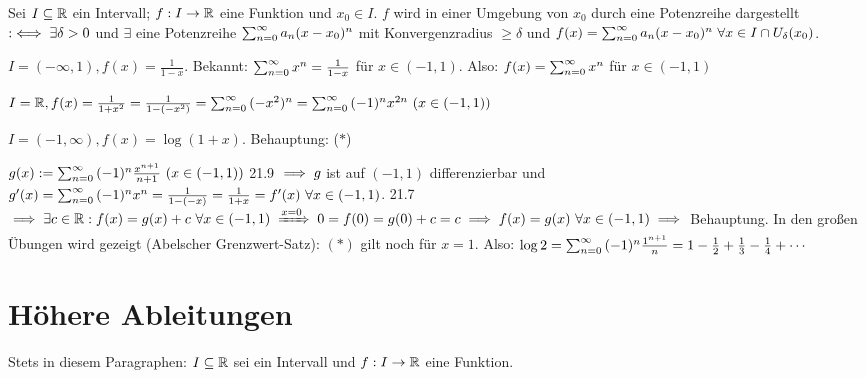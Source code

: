 \documentclass[a4paper,oneside,DIV15,BCOR12mm]{scrbook}
\begin{document}
\begin{definition}
Sei $I \subseteq \mathbb{R}$ ein Intervall; $f:I\to\mathbb{R}$ eine Funktion und $x_0\in I$. $f$ wird in einer Umgebung von $x_0$ durch eine Potenzreihe dargestellt $:\iff \exists \delta>0$ und $\exists$ eine Potenzreihe $\sum_{n=0}^{\infty}{a_n(x-x_0)^n}$ mit Konvergenzradius $\ge \delta$ und $f(x)=\sum_{n=0}^{\infty}{a_n(x-x_0)^n}\ \forall x \in I \cap U_{\delta}(x_0)$.
\end{definition}

\begin{beispiele}
\item $I=(-\infty, 1), f(x)=\frac{1}{1-x}.$ Bekannt: $\sum_{n=0}^{\infty}{x^n}=\frac{1}{1-x}$ für $x \in (-1, 1)$. Also: $f(x)=\sum_{n=0}^{\infty}{x^n}$ für $x \in (-1, 1)$
\item $I=\MdR, f(x)=\frac{1}{1+x^2}=\frac{1}{1-(-x^2)}=\reihenull{(-x^2)^n}=\reihenull{(-1)^nx^{2n}}\ (x\in(-1, 1))$
\item $I=(-1, \infty), f(x)=\log(1+x).$ Behauptung: ($*$) \\
\begin{beweis}
$g(x):=\sum_{n=0}^{\infty}{(-1)^n\frac{x^{n+1}}{n+1}}\ (x \in (-1, 1))$ 21.9 $\implies g$ ist auf $(-1, 1)$ differenzierbar und $g'(x)=\reihenull{(-1)^nx^n}=\frac{1}{1-(-x)}=\frac{1}{1+x}=f'(x)\ \forall x \in (-1, 1)$. 21.7 $\folgt \exists c \in \MdR: f(x)=g(x)+c\ \forall x \in (-1, 1) \folgtwegen{x=0}0=f(0)=g(0)+c=c\folgt f(x)=g(x)\ \forall x \in (-1, 1) \folgt$ Behauptung.
In den großen Übungen wird gezeigt (Abelscher Grenzwert-Satz): $(*)$ gilt noch für $x=1$. Also: $\log 2=\sum_{n=0}^{\infty}{(-1)^n\frac{1^{n+1}}{n}}=1-\frac{1}{2}+\frac{1}{3}-\frac{1}{4}+\cdots$
\end{beweis}
\end{beispiele}


\chapter{Höhere Ableitungen}

Stets in diesem Paragraphen: $I \subseteq \mathbb{R}$ sei ein Intervall und $f: I \to \mathbb{R}$ eine Funktion.
\end{document}
